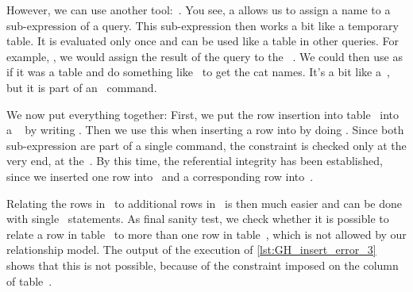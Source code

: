 %
However, we can use another tool:~.
You see, a  allows us to assign a name to a sub-expression of a query.
This sub-expression then works a bit like a temporary table.
It is evaluated only once and can be used like a table in other queries.
For example, , we would assign the result of the query  to the ~.
We could then use  as if it was a table and do something like~ to get the cat names.
It's a bit like a~, but it is part of an \sql\ command.%
%
\begin{sloppypar}%
We now put everything together:
First, we put the row insertion into table~ into a ~ by writing .
Then we use this  when inserting a row into  by doing .
Since both sub-expression are part of a single command, the constraint  is checked only at the very end, at the~\sqlil{;}.
By this time, the referential integrity has been established, since we inserted one row into~ and a corresponding row into~.%
\end{sloppypar}%
%
Relating the rows in~ to additional rows in~ is then much easier and can be done with single ~statements.
As final sanity test, we check whether it is possible to relate a row in table~ to more than one row in table~, which is not allowed by our relationship model.
The output of the execution of \cref{lst:GH_insert_error_3} shows that this is not possible, because of the  constraint imposed on the column~ of table~.%
%
\FloatBarrier%
\endhsection%
%
